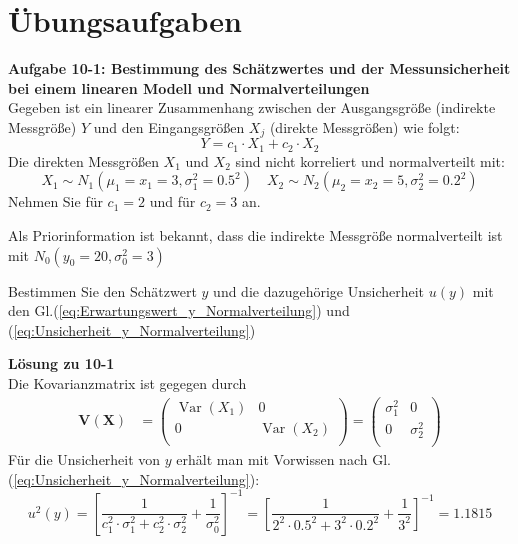 \begin{comment}
[y_KMsort, km_sort] = sort(y_KM);
p_2 = p_KM_2(km_sort);
diff_y = diff(y_KMsort);
mid_p_KM_2 = (p_2(2:nKM)+p_2(1:nKM-1))*0.5;
iuse = find(diff_y>0);
meandiff = mean(diff_y(iuse))
diff_y = diff_y/meandiff;
pdf = mid_p_KM_2(iuse)./diff_y(iuse);
figure(120);
plot(diff_y);
figure(121);
plot(y_KMsort(iuse),pdf);
sumpdf = 5.2e6; max(pdf)
figure(100);
plot( y_KMsort(iuse), max(posterior1)*pdf/sumpdf, 'g.',...
y, posterior1,'k-',...
y, posterior2,'r--',...
y, posterior3,'b-','linewidth',2);
xlabel('indirekte Groesse / Einheit', 'fontsize', 14);
ylabel('pdf', 'fontsize', 14);
legend('Dirac: Weise/Wuebbler','Geraet genau, Messobj schlecht',...
'beides ungenau','Geraet ungenau, Modell duenner Peak')
set(gcf, 'PaperUnits', 'centimeters');
x_width=15 ;y_width= 8;
set(gcf, 'PaperPosition', [0 0 x_width y_width]);
print '-dpng' Posterior_all.png
\end{verbatim}
\end{comment}
\newpage
\section{Übungsaufgaben}
\textbf{Aufgabe 10-1: Bestimmung des Schätzwertes und der Messunsicherheit bei
einem linearen Modell und Normalverteilungen}\\
Gegeben ist ein linearer Zusammenhang zwischen der Ausgangsgröße (indirekte
Messgröße) $Y$ und den Eingangsgrößen $X_j$ (direkte Messgrößen) wie folgt:
\[
Y = c_1 \cdot X_1 + c_2 \cdot X_2
\]
Die direkten Messgrößen $X_1$ und $X_2$ sind nicht korreliert und
normalverteilt mit:
\[
X_1 \sim N_{1}(\mu_1 =x_1=3,\sigma_1^2= 0.5^2 )
\quad X_2 \sim N_{2}(\mu_2=x_2= 5,\sigma_2^2=0.2^2 )
\]
Nehmen Sie für $c_1 = 2$ und für $c_2 = 3$ an.

Als Priorinformation ist bekannt, dass die indirekte Messgröße
normalverteilt ist mit \newline  $N_0(y_0=20,\sigma_0^2=3)$

Bestimmen Sie den Schätzwert $y$ und die dazugehörige Unsicherheit
$u(y)$ mit den Gl.(\ref{eq:Erwartungswert_y_Normalverteilung}) und
(\ref{eq:Unsicherheit_y_Normalverteilung})

\textbf{Lösung zu 10-1} \\
Die Kovarianzmatrix ist gegegen durch
\begin{align}
\boldsymbol{V(X)} &=
\begin{pmatrix}
\operatorname{Var}(X_1) & 0 \\
0 & \operatorname{Var}(X_2)  \\
\end{pmatrix}
=
\begin{pmatrix}
\sigma_1^2 & 0 \\
0 & \sigma_2^2 \\
\end{pmatrix}
\end{align}
Für die Unsicherheit von $y$ erhält man mit Vorwissen nach Gl.	(\ref{eq:Unsicherheit_y_Normalverteilung}):
\[
u^2(y) = \left[ \frac{1}{c_1^2\cdot \sigma_1^2 + c_2^2\cdot \sigma_2^2}
+ \frac{1}{\sigma_0^2} \right]^{-1}
 = \left[ \frac{1}{2^2\cdot 0.5^2 + 3^2\cdot 0.2^2}
+ \frac{1}{3^2} \right]^{-1} = 1.1815
\]


